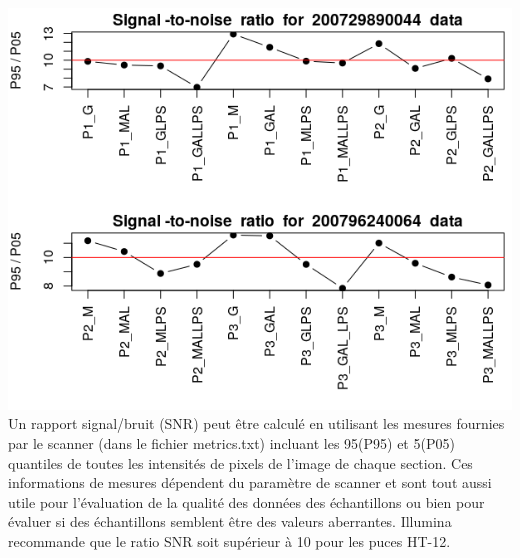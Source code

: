 \documentclass[a4paper,10pt]{article}
\begin{document}
\begin{center}
 \includegraphics[scale=0.5]{../../R/output/signal_to_noise.png}
 Un rapport signal/bruit (SNR) peut être calculé en utilisant les mesures fournies par le scanner (dans le fichier metrics.txt) incluant les 95(P95) et 5(P05) quantiles de toutes les intensités de pixels de  l’image de chaque section. 
 Ces informations de mesures dépendent du paramètre de scanner et sont tout aussi utile pour l’évaluation de la qualité des données des échantillons ou bien pour évaluer si des échantillons semblent être des valeurs aberrantes. 
 Illumina recommande que le ratio SNR soit supérieur à 10 pour les puces HT-12.
\end{center}
\end{document}
